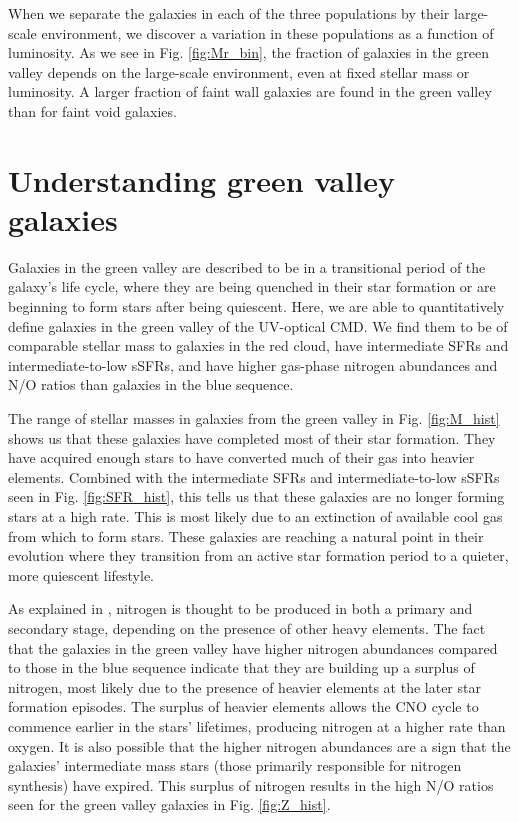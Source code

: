 When we separate the galaxies in each of the three populations by their 
large-scale environment, we discover a variation in these populations as a 
function of luminosity.  As we see in Fig. \ref{fig:Mr_bin}, the fraction of 
galaxies in the green valley depends on the large-scale environment, even at 
fixed stellar mass or luminosity.  A larger fraction of faint wall galaxies are 
found in the green valley than for faint void galaxies.




\section[Discussion]{Understanding green valley galaxies}

Galaxies in the green valley are described to be in a transitional period of the 
galaxy's life cycle, where they are being quenched in their star formation or 
are beginning to form stars after being quiescent.  Here, we are able to 
quantitatively define galaxies in the green valley of the UV-optical CMD.  We 
find them to be of comparable stellar mass to galaxies in the red cloud, have 
intermediate SFRs and intermediate-to-low sSFRs, and have higher gas-phase 
nitrogen abundances and N/O ratios than galaxies in the blue sequence.

The range of stellar masses in galaxies from the green valley in Fig. 
\ref{fig:M_hist} shows us that these galaxies have completed most of their star 
formation.  They have acquired enough stars to have converted much of their gas 
into heavier elements.  Combined with the intermediate SFRs and 
intermediate-to-low sSFRs seen in Fig. \ref{fig:SFR_hist}, this tells us that 
these galaxies are no longer forming stars at a high rate.  This is most likely 
due to an extinction of available cool gas from which to form stars.  These 
galaxies are reaching a natural point in their evolution where they transition 
from an active star formation period to a quieter, more quiescent lifestyle.

As explained in \cite{Douglass17b}, nitrogen is thought to be produced in both a 
primary and secondary stage, depending on the presence of other heavy elements.  
The fact that the galaxies in the green valley have higher nitrogen abundances 
compared to those in the blue sequence indicate that they are building up a 
surplus of nitrogen, most likely due to the presence of heavier elements at the 
later star formation episodes.  The surplus of heavier elements allows the CNO 
cycle to commence earlier in the stars' lifetimes, producing nitrogen at a 
higher rate than oxygen.  It is also possible that the higher nitrogen 
abundances are a sign that the galaxies' intermediate mass stars (those 
primarily responsible for nitrogen synthesis) have expired.  This surplus of 
nitrogen results in the high N/O ratios seen for the green valley galaxies in 
Fig. \ref{fig:Z_hist}.

